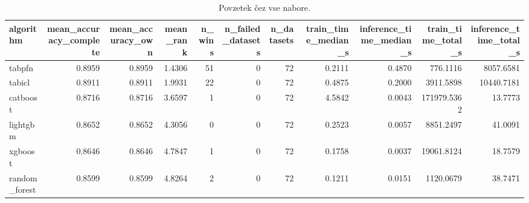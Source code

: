 \begin{table}[htbp]
\centering
\caption{Povzetek čez vse nabore.}
\label{tab:overall}
\begin{tabular}{lrrrrrrrrrr}
\hline
algorithm & mean\_accuracy\_complete & mean\_accuracy\_own & mean\_rank & n\_wins & n\_failed\_datasets & n\_datasets & train\_time\_median\_s & inference\_time\_median\_s & train\_time\_total\_s & inference\_time\_total\_s \\
\hline
tabpfn & 0.8959 & 0.8959 & 1.4306 & 51 & 0 & 72 & 0.2111 & 0.4870 & 776.1116 & 8057.6581 \\
tabicl & 0.8911 & 0.8911 & 1.9931 & 22 & 0 & 72 & 0.4875 & 0.2000 & 3911.5898 & 10440.7181 \\
catboost & 0.8716 & 0.8716 & 3.6597 & 1 & 0 & 72 & 4.5842 & 0.0043 & 171979.5362 & 13.7773 \\
lightgbm & 0.8652 & 0.8652 & 4.3056 & 0 & 0 & 72 & 0.2523 & 0.0057 & 8851.2497 & 41.0091 \\
xgboost & 0.8646 & 0.8646 & 4.7847 & 1 & 0 & 72 & 0.1758 & 0.0037 & 19061.8124 & 18.7579 \\
random\_forest & 0.8599 & 0.8599 & 4.8264 & 2 & 0 & 72 & 0.1211 & 0.0151 & 1120.0679 & 38.7471 \\
\hline
\end{tabular}
\end{table}
